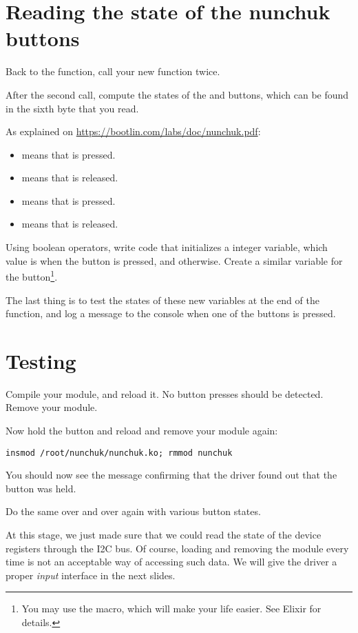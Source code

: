 \section{Reading the state of the nunchuk buttons}

Back to the  function, call your new function twice.

After the second call, compute the states of the  and 
buttons, which can be found in the sixth byte that you read.

As explained on
\url{https://bootlin.com/labs/doc/nunchuk.pdf}:

\begin{itemize}
\item {} means that  is pressed.
\item {} means that  is released.
\item {} means that  is pressed.
\item {} means that  is released.
\end{itemize}

Using boolean operators, write code that initializes a 
integer variable, which value is  when the  button is
pressed, and  otherwise. Create a similar 
variable for the  button\footnote{You may use the 
macro, which will make your life easier. See Elixir for details.}.

The last thing is to test the states of these new variables at the end
of the  function, and log a message to the console
when one of the buttons is pressed.

\section{Testing}

Compile your module, and reload it. No button presses should be
detected. Remove your module.

Now hold the  button and reload and remove your module again:
\begin{verbatim}
insmod /root/nunchuk/nunchuk.ko; rmmod nunchuk
\end{verbatim}

You should now see the message confirming that the driver found
out that the  button was held.

Do the same over and over again with various button states.

At this stage, we just made sure that we could read the state
of the device registers through the I2C bus. Of course, loading and
removing the module every time is not an acceptable way of
accessing such data. We will give the driver a proper {\em input}
interface in the next slides.
